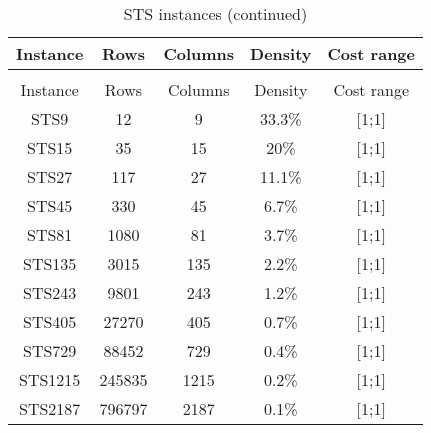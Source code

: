 \begin{longtable}{ccccc}
	\caption{STS instances}\\
	\toprule
	Instance & Rows & Columns & Density & Cost range\\
	\midrule
	\endfirsthead
	\caption{STS instances (continued)}\\
	\toprule
	Instance & Rows & Columns & Density & Cost range\\
	\midrule
	\endhead
	\bottomrule
	\endfoot
	STS9 & 12 & 9 & 33.3\% & [1;1]\\
	STS15 & 35 & 15 & 20\% & [1;1]\\
	STS27 & 117 & 27 & 11.1\% & [1;1]\\
	STS45 & 330 & 45 & 6.7\% & [1;1]\\
	STS81 & 1080 & 81 & 3.7\% & [1;1]\\
	STS135 & 3015 & 135 & 2.2\% & [1;1]\\
	STS243 & 9801 & 243 & 1.2\% & [1;1]\\
	STS405 & 27270 & 405 & 0.7\% & [1;1]\\
	STS729 & 88452 & 729 & 0.4\% & [1;1]\\
	STS1215 & 245835 & 1215 & 0.2\% & [1;1]\\
	STS2187 & 796797 & 2187 & 0.1\% & [1;1]\\
\end{longtable}

